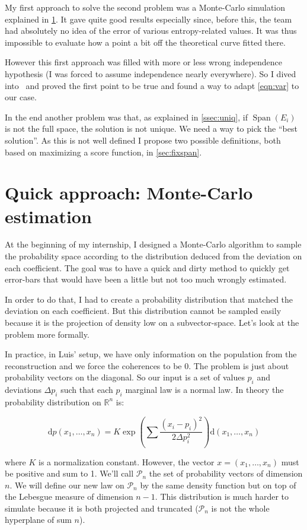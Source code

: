 \documentclass[10pt,a4paper]{report}
\theoremstyle{plain}
\theoremstyle{definition}
\theoremstyle{remark}
\newcommand{\R}{\ensuremath{\mathbb{R}}}
\newcommand{\dd}{\mathrm{d}}
\DeclareMathOperator{\Span}{Span}
\begin{document}
My first approach to solve the second problem was a Monte-Carlo simulation
explained in \cref{sec:MC}. It gave quite good results especially since,
before this, the team had absolutely no idea of the error of various
entropy-related values. It was thus impossible to evaluate how a point a
bit off the theoretical curve fitted there.

However this first approach was filled with more or less wrong independence
hypothesis (I was forced to assume independence nearly everywhere). So I dived
into~\cite{SPRAL17} and proved the first point to be true and found a way to
adapt \cref{eqn:var} to our case.

In the end another problem was that, as explained in \cref{ssec:uniq}, if
$\Span(E_i)$ is not the full space, the solution is not unique. We need a way to
pick the ``best solution''. As this is not well defined I propose two possible
definitions, both based on maximizing a score function, in \cref{sec:fixspan}.

\section{Quick approach: Monte-Carlo estimation}\label{sec:MC}

At the beginning of my internship, I designed a Monte-Carlo algorithm to sample
the probability space according to the distribution deduced from the deviation on
each coefficient. The goal was to have a quick and dirty method to quickly get
error-bars that would have been a little but not too much wrongly estimated.

In order to do that, I had to create a probability distribution that matched the
deviation on each coefficient. But this distribution
cannot be sampled easily because it is the projection of density low on a
subvector-space. Let's look at the problem more formally.

In practice, in Luis' setup, we have only information on the
population from the reconstruction and we force the coherences to be 0.
The problem is just about probability vectors on the diagonal.
So our input is a set of values
$p_i$ and deviations $\Delta p_i$ such that each $p_i$ marginal law is a normal
law. In theory the probability distribution on $\R^n$ is:

\[\dd p(x_1,\ldots,x_n) = K \exp\left(\sum \frac{(x_i - p_i)^2}{2\Delta p_i^2}
  \right) \dd(x_1,\ldots,x_n)\]

where $K$ is a normalization constant. However, the vector $x =(x_1,\ldots,x_n)$
must be positive and sum to 1. We'll call $\mathcal{P}_n$ the set of probability
vectors of dimension $n$. We will define our new law on $\mathcal{P}_n$ by the
same density function but on top of the Lebesgue measure of dimension $n-1$.
This distribution is much harder to simulate because it is both projected and
truncated ($\mathcal{P}_n$ is not the whole hyperplane of sum $n$).
\end{document}
